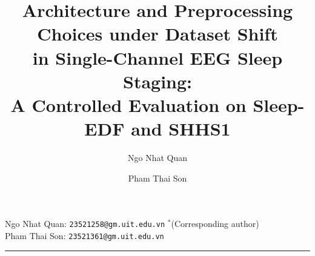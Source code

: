 \documentclass[11pt,a4paper]{article}
\begin{document}
\title{\bfseries\LARGE Architecture and Preprocessing Choices under Dataset Shift\\[0.15em]
in Single-Channel EEG Sleep Staging:\\[0.15em]
A Controlled Evaluation on Sleep-EDF and SHHS1}

\author[a,$\ast$]{Ngo Nhat Quan}
\author[a]{Pham Thai Son}

\date{}

\maketitle
\thispagestyle{empty}

\vspace{-1.0em}
\begin{center}
\small
Ngo Nhat Quan: \texttt{23521258@gm.uit.edu.vn} $^{\ast}$(Corresponding author) \\[0.2em]
Pham Thai Son: \texttt{23521361@gm.uit.edu.vn}
\end{center}

\vspace{0.4em}
\begin{center}\rule{0.9\textwidth}{0.4pt}\end{center}
\vspace{-0.2em}
\end{document}
